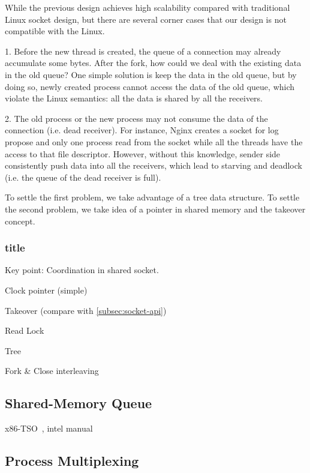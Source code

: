 While the previous design achieves high scalability compared with traditional Linux socket design, but there are several corner cases that our design is not compatible with the Linux.

1. Before the new thread is created, the queue of a connection may already accumulate some bytes. After the fork, how could we deal with the existing data in the old queue? One simple solution is keep the data in the old queue, but by doing so, newly created process cannot access the data of the old queue, which violate the Linux semantics: all the data is shared by all the receivers. 

2. The old process or the new process may not consume the data of the connection (i.e. dead receiver). For instance, Nginx creates a socket for log propose and only one process read from the socket while all the threads have the access to that file descriptor. However, without this knowledge, sender side consistently push data into all the receivers, which lead to starving and deadlock (i.e. the queue of the dead receiver is full).

To settle the first problem, we take advantage of a tree data structure. To settle the second problem, we take idea of a pointer in shared memory and the takeover concept.

\subsubsection{title}  



Key point: Coordination in shared socket.

Clock pointer (simple)

Takeover (compare with \ref{subsec:socket-api})

Read Lock

Tree

Fork \& Close interleaving

\subsection{Shared-Memory Queue}

x86-TSO~\cite{sewell2010x86}, intel manual~\cite{intel-manual}

\subsection{Process Multiplexing}
\label{subsec:epoll}


